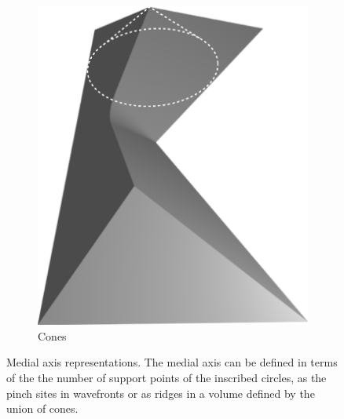 \begin{figure}
\begin{subfigure}{0.3\columnwidth}
\includegraphics[height=1.5\columnwidth]{sources/method/MAT_explanation_cones.pdf}
\caption{Cones}
\end{subfigure}
\caption{
Medial axis representations.
The medial axis can be defined in terms of the the number of support points of the inscribed circles,
as the pinch sites in wavefronts
or as ridges in a volume defined by the union of cones.
}
\label{MAT_explanation}
\end{figure}


